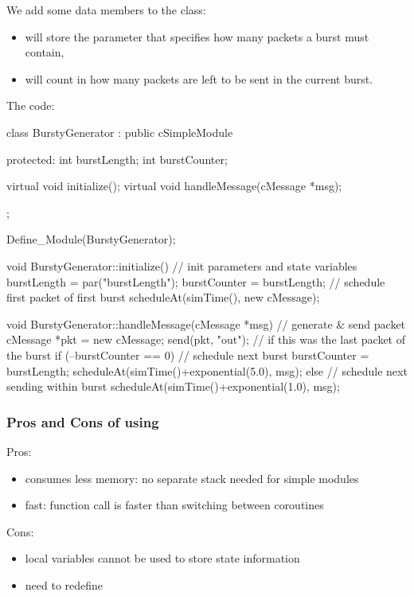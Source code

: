 We add some data members to the class:
\begin{itemize}
\item{ will store the parameter that specifies how many
    packets a burst must contain,}
\item{ will count in how many packets are left to be sent
    in the current burst.}
\end{itemize}

The code:

\begin{cpp}
class BurstyGenerator : public cSimpleModule
{
  protected:
    int burstLength;
    int burstCounter;

    virtual void initialize();
    virtual void handleMessage(cMessage *msg);
};

Define_Module(BurstyGenerator);

void BurstyGenerator::initialize()
{
    // init parameters and state variables
    burstLength = par("burstLength");
    burstCounter = burstLength;
    // schedule first packet of first burst
    scheduleAt(simTime(), new cMessage);
}

void BurstyGenerator::handleMessage(cMessage *msg)
{
    // generate & send packet
    cMessage *pkt = new cMessage;
    send(pkt, "out");
    // if this was the last packet of the burst
    if (--burstCounter == 0)
    {
        // schedule next burst
        burstCounter = burstLength;
        scheduleAt(simTime()+exponential(5.0), msg);
    }
    else
    {
        // schedule next sending within burst
        scheduleAt(simTime()+exponential(1.0), msg);
    }
}
\end{cpp}



\subsubsection{Pros and Cons of using }


Pros:
\begin{itemize}
  \item{consumes less memory: no separate stack needed for simple modules}
  \item{fast: function call is faster than switching between coroutines}
\end{itemize}

Cons:
\begin{itemize}
  \item{local variables cannot be used to store state information}
  \item{need to redefine }
\end{itemize}

